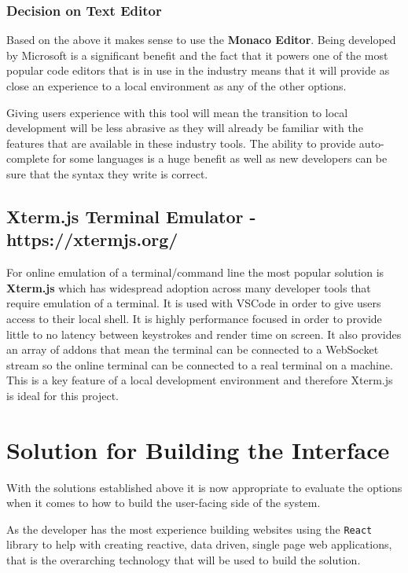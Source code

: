 \subsubsection{Decision on Text Editor}

Based on the above it makes sense to use the \textbf{Monaco Editor}. Being developed by Microsoft is a significant benefit and the fact that it powers one of the most popular code editors that is in use in the industry means that it will provide as close an experience to a local environment as any of the other options.

Giving users experience with this tool will mean the transition to local development will be less abrasive as they will already be familiar with the features that are available in these industry tools. The ability to provide auto-complete for some languages is a huge benefit as well as new developers can be sure that the syntax they write is correct.

\subsection{Xterm.js Terminal Emulator - https://xtermjs.org/}

For online emulation of a terminal/command line the most popular solution is \textbf{Xterm.js} which has widespread adoption across many developer tools that require emulation of a terminal. It is used with VSCode in order to give users access to their local shell. It is highly performance focused in order to provide little to no latency between keystrokes and render time on screen. It also provides an array of addons that mean the terminal can be connected to a WebSocket stream so the online terminal can be connected to a real terminal on a machine. This is a key feature of a local development environment and therefore Xterm.js is ideal for this project.

\section{Solution for Building the Interface} \label{solapp-tools}

With the solutions established above it is now appropriate to evaluate the options when it comes to how to build the user-facing side of the system.

As the developer has the most experience building websites using the \texttt{React} library \cite{react} to help with creating reactive, data driven, single page web applications, that is the overarching technology that will be used to build the solution.

